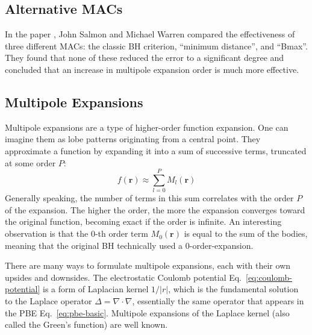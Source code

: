 \subsection{Alternative MACs}
\label{sec:optimization-techniques-optimization-macs}

In the paper \cite{salmon1994skeletons}, John Salmon and Michael Warren compared the effectiveness of three different MACs: the classic BH criterion, ``minimum distance'', and ``Bmax''.
They found that none of these reduced the error to a significant degree and concluded that an increase in multipole expansion order is much more effective.

\subsection{Multipole Expansions}
\label{sec:optimization-techniques-nbody-multipole-expansions}
Multipole expansions are a type of higher-order function expansion.
One can imagine them as lobe patterns originating from a central point.
They approximate a function by expanding it into a sum of successive terms, truncated at some order $P$:
\begin{equation}
f(\mathbf{r}) \approx \sum_{l=0}^{P} M_l(\mathbf{r})
\label{eq:generic-multipole-expansion}
\end{equation}
Generally speaking, the number of terms in this sum correlates with the order $P$ of the expansion.
The higher the order, the more the expansion converges toward the original function, becoming exact if the order is infinite.
An interesting observation is that the 0-th order term $M_0(\mathbf{r})$ is equal to the sum of the bodies, meaning that the original BH technically used a 0-order-expansion.

There are many ways to formulate multipole expansions, each with their own upsides and downsides.
The electrostatic Coulomb potential Eq.~\eqref{eq:coulomb-potential} is a form of Laplacian kernel $1/|r|$, which is the fundamental solution to the Laplace operator $\Delta = \nabla \cdot \nabla$, essentially the same operator that appears in the PBE Eq.~\eqref{eq:pbe-basic}.
Multipole expansions of the Laplace kernel (also called the Green's function) are well known.

